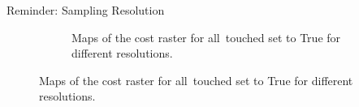 \documentclass[usenames,dvipsnames,aspectratio=169]{beamer}
\begin{document}
	\begin{frame}{Reminder: Sampling Resolution}
		\begin{figure}
		\begin{figure}
			\centering
			\enskip
			\enskip
			
			\caption{Maps of the cost raster for all~touched set to True for different resolutions.}
			\label{fig:CostAllTouchedTrue}
		\end{figure}
		\end{figure}
	\end{frame}

	
	
\end{document}
